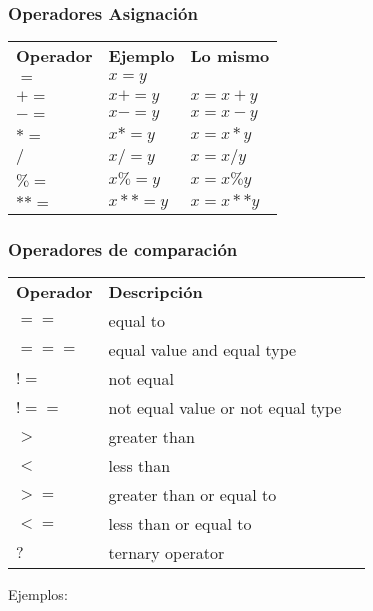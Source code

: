\subsubsection{Operadores Asignaci\'on}
\begin{flushleft}
\begin{spacing}{1.7}
    \begin{tabular}{p{4cm} ll}
     \textbf{Operador}      & \textbf{ Ejemplo} & \textbf{ Lo mismo} \\ %
	 $ =$ &       $x = y$       &                     \\
	 $+=$ &       $x += y$      &      $x = x + y$    \\
	 $-=$ &       $x -= y$      &      $ x = x - y$   \\
     $*=$ &       $x *= y$      &      $ x = x * y$   \\
     $ /$ &       $x /= y$      &      $ x = x / y$   \\
     $\%=$&       $x \%= y$     &      $ x = x \% y$  \\
     $**=$ &      $x **= y$     &      $ x = x**y$           
    \end{tabular}
\end{spacing}
\end{flushleft}

\subsubsection{Operadores de comparaci\'on}
\begin{flushleft}
\begin{spacing}{1.7}
    \begin{tabular}{p{4cm} ll}
     \textbf{Operador}      & \textbf{Descripci\'on}  \\ %
        $==$  & 	equal to   \\
        $===$  & 	equal value and equal type   \\
        $!=$  & 	not equal   \\
        $!==$  & 	not equal value or not equal type   \\
        $>$  & 	greater than   \\
        $<$  & 	less than   \\
        $>=$  & 	greater than or equal to   \\
        $<=$  & 	less than or equal to   \\
        $?$  & 	ternary operator   \\
    \end{tabular}
\end{spacing}
\end{flushleft}
Ejemplos: 

